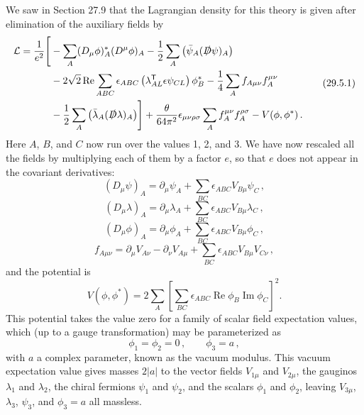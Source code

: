 We saw in Section 27.9 that the Lagrangian density for this theory is given
after elimination of the auxiliary fields by
\begin{equation}
  \begin{aligned}
  \mathcal{L}
  =\frac{1}{e^2}\Biggl[
  &-\sum_A(D_\mu\phi)_A^*(D^\mu\phi)_A
  -\frac12\sum_A\left(\bar\psi_A(\sl{D}\psi)_A\right)
  \\
  &-2\sqrt{2}\operatorname{Re}\sum_{ABC}
    \epsilon_{ABC}
    \left(\lambda_{AL}^{\mathsf T}\epsilon\psi_{CL}\right)\phi_B^*
  -\frac14\sum_A f_{A\mu\nu}f_A^{\mu\nu}
  \\
  &-\frac12\sum_A\left(\bar\lambda_A(\sl{D}\lambda)_A\right)
  \Biggr]
  +\frac{\theta}{64\pi^2}\epsilon_{\mu\nu\rho\sigma}
    \sum_A f_A^{\mu\nu}f_A^{\rho\sigma}
  -V(\phi,\phi^*)\,.
  \end{aligned}
  \tag{29.5.1}\label{eq:29.5.1}
\end{equation}
Here \(A\), \(B\), and \(C\) now run over the values 1, 2, and 3. We have now
rescaled all the fields by multiplying each of them by a factor \(e\), so
that \(e\) does not appear in the covariant derivatives:
\begin{equation}
  (D_\mu\psi)_A
  =\partial_\mu\psi_A+\sum_{BC}\epsilon_{ABC}V_{B\mu}\psi_C\,,
  \tag{29.5.2}\label{eq:29.5.2}
\end{equation}
\begin{equation}
  (D_\mu\lambda)_A
  =\partial_\mu\lambda_A+\sum_{BC}\epsilon_{ABC}V_{B\mu}\lambda_C\,,
  \tag{29.5.3}\label{eq:29.5.3}
\end{equation}
\begin{equation}
  (D_\mu\phi)_A
  =\partial_\mu\phi_A+\sum_{BC}\epsilon_{ABC}V_{B\mu}\phi_C\,,
  \tag{29.5.4}\label{eq:29.5.4}
\end{equation}
\begin{equation}
  f_{A\mu\nu}
  =\partial_\mu V_{A\nu}-\partial_\nu V_{A\mu}
  +\sum_{BC}\epsilon_{ABC}V_{B\mu}V_{C\nu}\,,
  \tag{29.5.5}\label{eq:29.5.5}
\end{equation}
and the potential is
\begin{equation}
  V(\phi,\phi^*)
  =2\sum_A\left[
    \sum_{BC}\epsilon_{ABC}\operatorname{Re}\phi_B
    \operatorname{Im}\phi_C
  \right]^2.
  \tag{29.5.6}\label{eq:29.5.6}
\end{equation}
This potential takes the value zero for a family of scalar field expectation
values, which (up to a gauge transformation) may be parameterized as
\begin{equation}
  \phi_1=\phi_2=0\,,
  \qquad
  \phi_3=a\,,
  \tag{29.5.7}\label{eq:29.5.7}
\end{equation}
with \(a\) a complex parameter, known as the vacuum modulus. This vacuum
expectation value gives masses \(2\lvert a\rvert\) to the vector fields
\(V_{1\mu}\) and \(V_{2\mu}\), the gauginos \(\lambda_1\) and \(\lambda_2\),
the chiral fermions \(\psi_1\) and \(\psi_2\), and the scalars \(\phi_1\) and
\(\phi_2\), leaving \(V_{3\mu}\), \(\lambda_3\), \(\psi_3\), and
\(\phi_3=a\) all massless.

